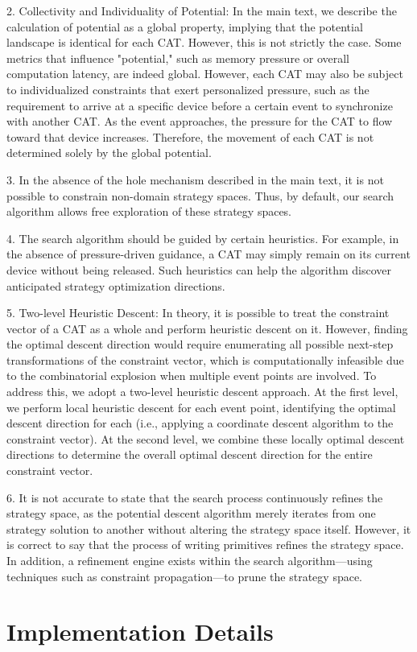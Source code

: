 \documentclass[letterpaper,twocolumn,10pt]{article}
\begin{document}
2. Collectivity and Individuality of Potential: In the main text, we describe the calculation of potential as a global property, implying that the potential landscape is identical for each CAT. However, this is not strictly the case. Some metrics that influence "potential," such as memory pressure or overall computation latency, are indeed global. However, each CAT may also be subject to individualized constraints that exert personalized pressure, such as the requirement to arrive at a specific device before a certain event to synchronize with another CAT. As the event approaches, the pressure for the CAT to flow toward that device increases. Therefore, the movement of each CAT is not determined solely by the global potential.

3. In the absence of the hole mechanism described in the main text, it is not possible to constrain non-domain strategy spaces. Thus, by default, our search algorithm allows free exploration of these strategy spaces.

4. The search algorithm should be guided by certain heuristics. For example, in the absence of pressure-driven guidance, a CAT may simply remain on its current device without being released. Such heuristics can help the algorithm discover anticipated strategy optimization directions.

5. Two-level Heuristic Descent: In theory, it is possible to treat the constraint vector of a CAT as a whole and perform heuristic descent on it. However, finding the optimal descent direction would require enumerating all possible next-step transformations of the constraint vector, which is computationally infeasible due to the combinatorial explosion when multiple event points are involved. To address this, we adopt a two-level heuristic descent approach. At the first level, we perform local heuristic descent for each event point, identifying the optimal descent direction for each (i.e., applying a coordinate descent algorithm to the constraint vector). At the second level, we combine these locally optimal descent directions to determine the overall optimal descent direction for the entire constraint vector.

6. It is not accurate to state that the search process continuously refines the strategy space, as the potential descent algorithm merely iterates from one strategy solution to another without altering the strategy space itself. However, it is correct to say that the process of writing primitives refines the strategy space. In addition, a refinement engine exists within the search algorithm—using techniques such as constraint propagation—to prune the strategy space.

\section{Implementation Details}
\label{sec:implementation_details}

\end{document}
